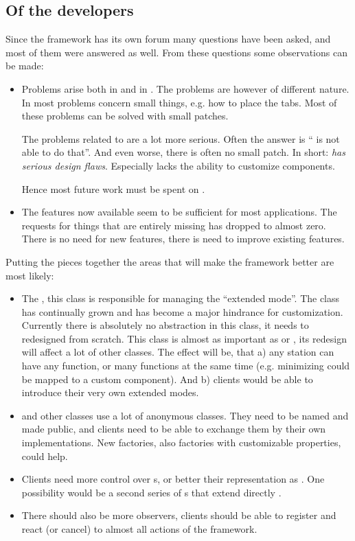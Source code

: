 \subsection{Of the developers}
Since the framework has its own forum many questions have been asked, and most of them were answered as well. From these questions some observations can be made:

\begin{itemize}
 \item Problems arise both in  and in . The problems are however of different nature. In  most problems concern small things, e.g. how to place the tabs. Most of these problems can be solved with small patches. 
 
 The problems related to  are a lot more serious. Often the answer is `` is not able to do that''. And even worse, there is often no small patch. In short: \textit{ has serious design flaws}. Especially  lacks the ability to customize components.
 
 Hence most future work must be spent on .
 
 \item The features now available seem to be sufficient for most applications. The requests for things that are entirely missing has dropped to almost zero. There is no need for new features, there is need to improve existing features.
\end{itemize}

Putting the pieces together the areas that will make the framework better are most likely:
\begin{itemize}
 \item The , this class is responsible for managing the ``extended mode''. The class has continually grown and has become a major hindrance for customization. Currently there is absolutely no abstraction in this class, it needs to redesigned from scratch. This class is almost as important as  or , its redesign will affect a lot of other classes. The effect will be, that a) any station can have any function, or many functions at the same time (e.g. minimizing could be mapped to a custom component). And b) clients would be able to introduce their very own extended modes.
 \item {} and other classes use a lot of anonymous classes. They need to be named and made public, and clients need to be able to exchange them by their own implementations. New factories, also factories with customizable properties, could help.
 \item Clients need more control over s, or better their representation as . One possibility would be a second series of s that extend directly .
 \item There should also be more observers, clients should be able to register and react (or cancel) to almost all actions of the framework.
\end{itemize}
 
